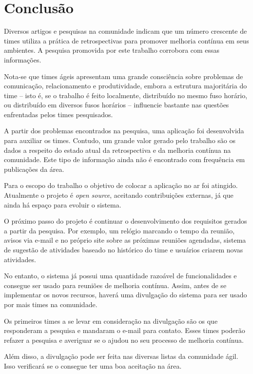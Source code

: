 \section{Conclusão}

Diversos artigos e pesquisas na comunidade indicam que um número crescente de times utiliza a prática de retrospectivas para promover melhoria contínua em seus ambientes. A pesquisa promovida por este trabalho corrobora com essas informações.

Nota-se que times ágeis apresentam uma grande consciência sobre problemas de comunicação, relacionamento e produtividade, embora a estrutura majoritária do time -- isto é, se o trabalho é feito localmente, distribuído no mesmo fuso horário, ou distribuído em diversos fusos horários -- influencie bastante nas questões enfrentadas pelos times pesquisados.

A partir dos problemas encontrados na pesquisa, uma aplicação foi desenvolvida para auxiliar os times. Contudo, um grande valor gerado pelo trabalho são os dados a respeito do estado atual da retrospectiva e da melhoria contínua na comunidade. Este tipo de informação ainda não é encontrado com frequência em publicações da área.

Para o escopo do trabalho o objetivo de colocar a aplicação no ar foi atingido. Atualmente o projeto é \textit{open source}, aceitando contribuições externas, já que ainda há espaço para evoluir o sistema.  

O próximo passo do projeto é continuar o desenvolvimento dos requisitos gerados a partir da pesquisa. Por exemplo, um relógio marcando o tempo da reunião, avisos via e-mail e no próprio site sobre as próximas reuniões agendadas, sistema de sugestão de atividades baseado no histórico do time e usuários criarem novas atividades.

No entanto, o sistema já possui uma quantidade razoável de funcionalidades e consegue ser usado para reuniões de melhoria contínua. Assim, antes de se implementar os novos recursos, haverá uma divulgação do sistema para ser usado por mais times na comunidade.

 Os primeiros times a se levar em consideração na divulgação são os que responderam a pesquisa e mandaram o e-mail para contato. Esses times poderão refazer a pesquisa e averiguar se o \suricato{} ajudou no seu processo de melhoria contínua.

Além disso, a divulgação pode ser feita nas diversas listas da comunidade ágil. Isso verificará se o \suricato{} consegue ter uma boa aceitação na área. 

